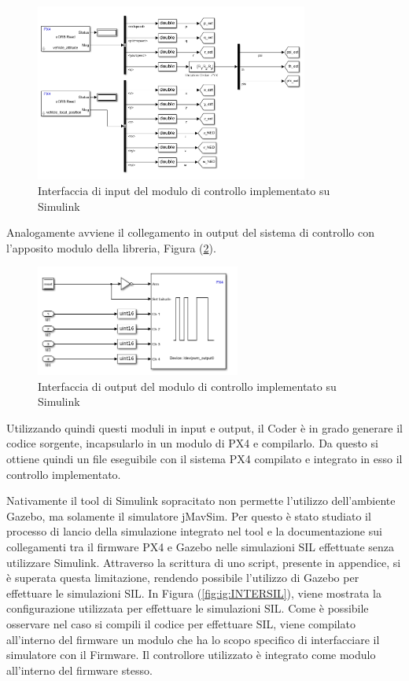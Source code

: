 \begin{figure}
	\centering
	\includegraphics[width=0.8\textwidth]{DescrizioneAutopilota/Figure/IN}
	\caption{Interfaccia di input del modulo di controllo implementato su Simulink}
	\label{fig:in}
\end{figure}

Analogamente avviene il collegamento in output del sistema di controllo con l'apposito modulo della libreria, Figura (\ref{fig:out}).

\begin{figure}
	\centering
	\includegraphics[width=0.6\textwidth]{DescrizioneAutopilota/Figure/OUT}
	\caption{Interfaccia di output del modulo di controllo implementato su Simulink}
	\label{fig:out}
\end{figure}

Utilizzando quindi questi moduli in input e output, il Coder è in grado generare il codice sorgente, incapsularlo in un modulo di PX4 e compilarlo. Da questo si ottiene quindi un file eseguibile con il sistema PX4 compilato e integrato in esso il controllo implementato. 

Nativamente il tool di Simulink sopracitato non permette l'utilizzo dell'ambiente Gazebo, ma solamente il simulatore jMavSim. Per questo è stato studiato il processo di lancio della simulazione integrato nel tool e la documentazione sui collegamenti tra il firmware PX4 e Gazebo nelle simulazioni SIL effettuate senza utilizzare Simulink. Attraverso la scrittura di uno script, presente in appendice, si è superata questa limitazione, rendendo possibile l'utilizzo di Gazebo per effettuare le simulazioni SIL. In Figura (\ref{fig:ig:INTERSIL}), viene mostrata la configurazione utilizzata per effettuare le simulazioni SIL. Come è possibile osservare nel caso si compili il codice per effettuare SIL, viene compilato all'interno del firmware un modulo che ha lo scopo specifico di interfacciare il simulatore con il Firmware. Il controllore utilizzato è integrato come modulo all'interno del firmware stesso.

